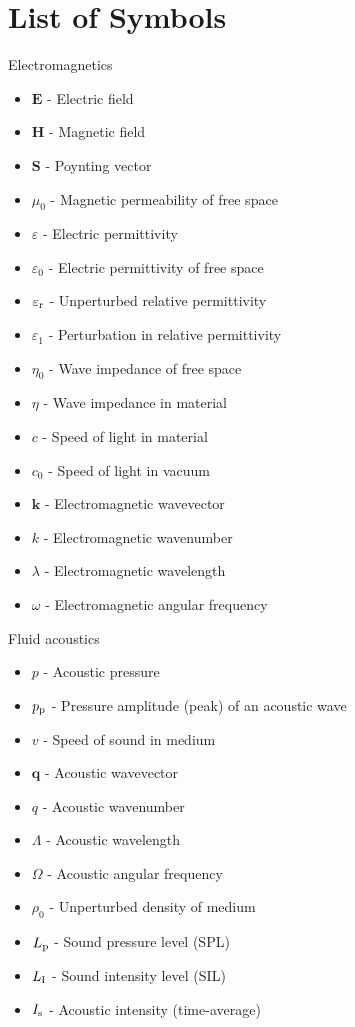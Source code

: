 \documentclass[11pt,twoside]{eitExjobb}
\begin{document}
	\chapter*{List of Symbols}
		Electromagnetics
		\begin{itemize}
			\item $\bm{E}$ - Electric field
			\item $\bm{H}$ - Magnetic field
			\item $\bm{S}$ - Poynting vector
			\item $\mu_0$ - Magnetic permeability of free space
			\item $\varepsilon$ - Electric permittivity
			\item $\varepsilon_0$ - Electric permittivity of free space
			\item $\varepsilon_{\mathrm{r}}$ - Unperturbed relative permittivity
			\item $\varepsilon_1$ - Perturbation in relative permittivity
			\item $\eta_0$ - Wave impedance of free space
			\item $\eta$ - Wave impedance in material
			\item $c$ - Speed of light in material
			\item $c_0$ - Speed of light in vacuum
			\item $\bm{k}$ - Electromagnetic wavevector
			\item $k$ - Electromagnetic wavenumber
			\item $\lambda$ - Electromagnetic wavelength
			\item $\omega$ - Electromagnetic angular frequency
		\end{itemize}
		Fluid acoustics
		\begin{itemize}
			\item $p$ - Acoustic pressure
			\item $p_{\mathrm{p}}$ - Pressure amplitude (peak) of an acoustic wave
			\item $v$ - Speed of sound in medium
			\item $\bm{q}$ - Acoustic wavevector
			\item $q$ - Acoustic wavenumber
			\item $\Lambda$ - Acoustic wavelength
			\item $\Omega$ - Acoustic angular frequency
			\item $\rho_0$ - Unperturbed density of medium
			\item $L_{\mathrm{p}}$ - Sound pressure level (SPL)
			\item $L_{\mathrm{I}}$ - Sound intensity level (SIL)
			\item $I_{\mathrm{s}}$ - Acoustic intensity (time-average)
		\end{itemize}
\end{document}
